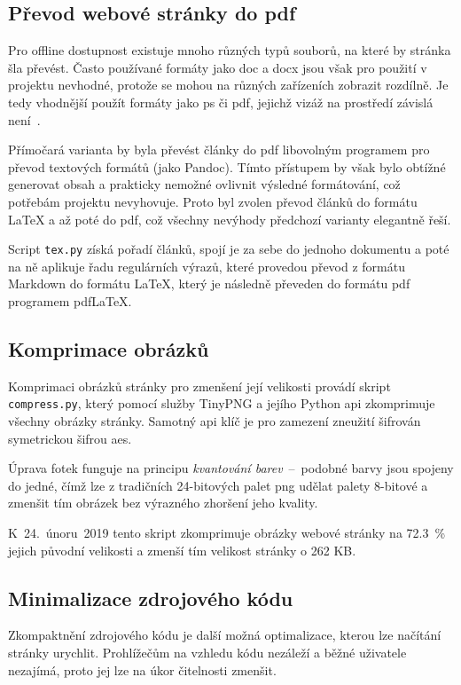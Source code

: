 \documentclass[a4paper, 12pt, twoside]{article}
\begin{document}
  \subsection{Převod webové stránky do \acrshort{pdf}} \label{sec:Převod webové stránky do PDF}
  Pro offline dostupnost existuje mnoho různých typů souborů, na které by stránka šla převést. Často používané formáty jako \gls{doc} a \gls{docx} jsou však pro použití v projektu nevhodné, protože se mohou na různých zařízeních zobrazit rozdílně. Je tedy vhodnější použít formáty jako \gls{ps} či \gls{pdf}, jejichž vizáž na prostředí závislá není~\cite{history-of-pdf}.

  Přímočará varianta by byla převést články do \gls{pdf} libovolným programem pro převod textových formátů (jako Pandoc). Tímto přístupem by však bylo obtížné generovat obsah a prakticky nemožné ovlivnit výsledné formátování, což potřebám projektu nevyhovuje. Proto byl zvolen převod článků do formátu \LaTeX{} a až poté do \gls{pdf}, což všechny nevýhody předchozí varianty elegantně řeší.

  Script \texttt{tex.py} získá pořadí článků, spojí je za sebe do jednoho dokumentu a poté na ně aplikuje řadu regulárních výrazů, které provedou převod z formátu Markdown do formátu \LaTeX, který je následně převeden do formátu \gls{pdf} programem pdf\LaTeX.


  \subsection{Komprimace obrázků}
  Komprimaci obrázků stránky pro zmenšení její velikosti provádí skript \texttt{compress.py}, který pomocí služby TinyPNG a jejího Python \gls{api} zkomprimuje všechny obrázky stránky. Samotný \gls{api} klíč je pro zamezení zneužití šifrován symetrickou šifrou \gls{aes}.

  Úprava fotek funguje na principu \emph{kvantování barev}~--~podobné barvy jsou spojeny do jedné, čímž lze z tradičních 24-bitových palet \gls{png} udělat palety 8-bitové a zmenšit tím obrázek bez výrazného zhoršení jeho kvality.

  K~24.~únoru~2019 tento skript zkomprimuje obrázky webové stránky na \SI{72.3}{\percent} jejich původní velikosti a zmenší tím velikost stránky o \num{262} KB.


  \subsection{Minimalizace zdrojového kódu}
  Zkompaktnění zdrojového kódu je další možná optimalizace, kterou lze načítání stránky urychlit. Prohlížečům na vzhledu kódu nezáleží a běžné uživatele nezajímá, proto jej lze na úkor čitelnosti zmenšit.
\end{document}
